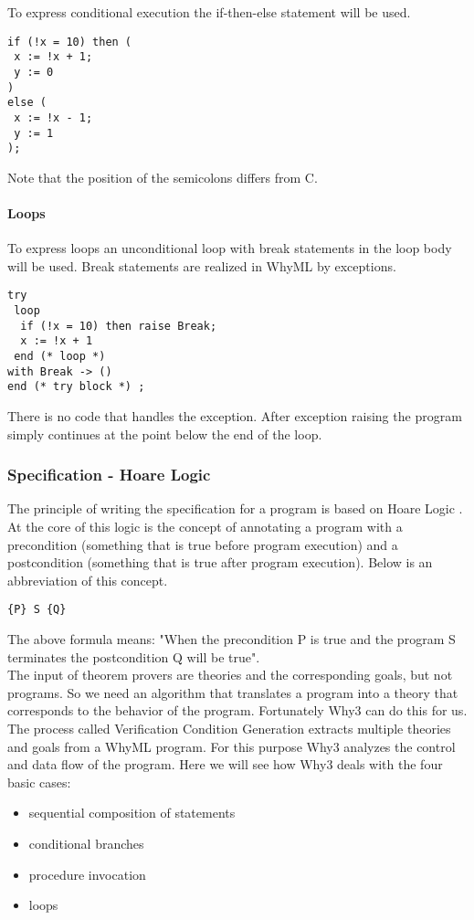 To express conditional execution the if-then-else statement will be used.
\begin{lstlisting}
if (!x = 10) then (
 x := !x + 1;
 y := 0
)
else (
 x := !x - 1;
 y := 1
);
\end{lstlisting}
Note that the position of the semicolons differs from C.

\paragraph{Loops}

To express loops an unconditional loop with break statements in the loop body
will be used. Break statements are realized in WhyML by exceptions.
\begin{lstlisting}
try
 loop
  if (!x = 10) then raise Break;
  x := !x + 1 
 end (* loop *)
with Break -> ()
end (* try block *) ;
\end{lstlisting}
There is no code that handles the exception. After exception raising the program simply continues 
at the point below the end of the loop.

\subsubsection{Specification - Hoare Logic}

The principle of writing the specification for a program is based on
Hoare Logic \cite[p. 65--74]{fmb}. At the core of this logic is the
concept of annotating a program with a precondition (something that is true before program execution) and a postcondition (something that is true
after program execution). Below is an abbreviation of this concept.
\begin{lstlisting}
{P} S {Q}
\end{lstlisting}
The above formula means: "When the precondition P is true
and the program S terminates the postcondition Q will be true".\\
The input of theorem provers are theories and the corresponding
goals, but not programs. So we need an algorithm that translates a program
into a theory that corresponds to the behavior of the program. 
Fortunately Why3 can do this for us. The process called Verification 
Condition Generation extracts multiple theories and goals from a WhyML
program. For this purpose Why3 analyzes the control and data flow of the program.
Here we will see how Why3 deals with the four basic cases:
\begin{itemize}
\item sequential composition of statements
\item conditional branches
\item procedure invocation
\item loops
\end{itemize}

